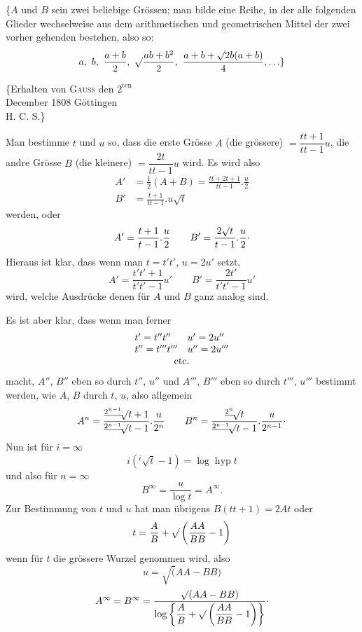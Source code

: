 \begingroup
{}
\par\indent \{$A$ und $B$ sein zwei beliebige Grössen; man bilde eine Reihe, in der alle folgenden Glieder wechselweise aus dem arithmetischen und geometrischen Mittel der zwei vorher gehenden bestehen, also so:
\[
a,\ b,\ \frac{a+b}{2},\ \surd\frac{ab+b^2}{2},\ \frac{a+b+\surd2b(a+b)}4,\ldots\}
\]
\ClosingRule
\begin{flushright}\small
\{Erhalten von \textsc{Gauss} den $2^{\mathrm{ten}}$\\
December 1808 Göttingen\\
H. C. S.\}
\end{flushright}
\par\indent Man bestimme $t$ und $u$ so, dass die erste Grösse $A$ (die grössere) $=\dfrac{tt+1}{tt-1}u$, die andre Grösse $B$ (die kleinere) $=\dfrac{2t}{tt-1}u$ wird. Es wird also
\[
\begin{aligned}
A'&=\tfrac12(A+B)=\frac{tt+2t+1}{tt-1}.\frac u2\\[.6em]
B'&=\frac{t+1}{tt-1}.u\surd t
\end{aligned}
\]
\noindent werden, oder
\[
A'=\frac{t+1}{t-1}.\frac u2\qquad B'=\frac{2\surd t}{t-1}.\frac u2\mathpunct{\raisebox{.5ex}{.}}
\]
\noindent Hieraus ist klar, dass wenn man $t=t't'$, $u=2u'$ setzt,
\[
A'=\frac{t't'+1}{t't'-1}u'\qquad B'=\frac{2t'}{t't'-1}u'
\]
\noindent wird, welche Ausdrücke denen für $A$ und $B$ ganz analog sind.

\par\indent Es ist aber klar, dass wenn man ferner
\[
\begin{array}{ll}
t'=t''t''&u'=2u''\\
t''=t'''t'''&u''=2u'''\\
\multicolumn{2}{c}{\text{etc.}}
\end{array}
\]
\noindent macht, $A''$, $B''$ eben so durch $t''$, $u''$ und $A'''$, $B'''$ eben so durch $t'''$, $u'''$ bestimmt werden, wie $A$, $B$ durch $t$, $u$, also allgemein
\clearpage
{}
\newcommand{\IndexStrokeRoot}[1]{{}^{\underline{#1}}\!\surd}
\[
A^n=\frac{\IndexStrokeRoot{2^{n-1}}t+1}{\IndexStrokeRoot{2^{n-1}}t-1}.\frac u{2^n}
\qquad
B^n=\frac{\IndexStrokeRoot{2^n}t}{\IndexStrokeRoot{2^{n-1}}t-1}.\frac u{2^{n-1}}\mathpunct{\raisebox{.5ex}{.}}
\]
\noindent Nun ist für $i=\infty$
\[
i({}^i\!\surd t-1)=\log\operatorname{hyp}t
\]
\noindent und also für $n=\infty$
\[
B^\infty=\frac u{\log t}=A^\infty.
\]
\noindent Zur Bestimmung von $t$ und $u$ hat man übrigens $B(tt+1)=2At$ oder
\[
t=\frac AB+\surd\left(\frac{AA}{BB}-1\right)
\]
\noindent wenn für $t$ die grössere Wurzel genommen wird, also
\[
u=\surd(AA-BB)
\]
\[
A^\infty=B^\infty=\frac{\surd(AA-BB)}{\log\left\{\dfrac AB+\surd\left(\dfrac{AA}{BB}-1\right)\right\}}\mathpunct{\raisebox{.5ex}{.}}
\]
\clearpage
\endgroup
